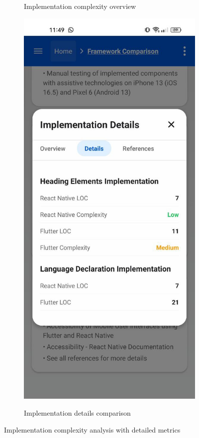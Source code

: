 \begin{figure}[ht]
\begin{subfigure}[b]{0.37\textwidth}
        \caption{Implementation complexity overview}
        \label{fig:implementation-complexity-card}
    \end{subfigure}
    \hfill
    \begin{subfigure}[b]{0.37\textwidth}
        \centering
        \includegraphics[width=\linewidth, alt={Implementation Details modal showing comparison metrics}]{img/methodology-details.jpg}
        \caption{Implementation details comparison}
        \label{fig:implementation-details-modal}
    \end{subfigure}
    \caption{Implementation complexity analysis with detailed metrics}
    \label{fig:implementation_complexity}
\end{figure}


